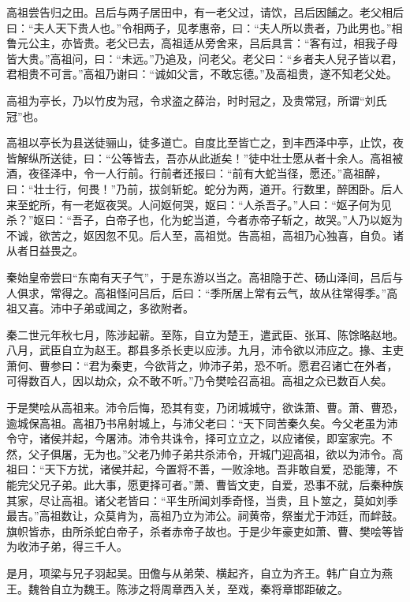 \documentclass[12pt,UTF8]{ctexbook}
\begin{document}
高祖尝告归之田。吕后与两子居田中，有一老父过，请饮，吕后因餔之。老父相后曰：“夫人天下贵人也。”令相两子，见孝惠帝，曰：“夫人所以贵者，乃此男也。”相鲁元公主，亦皆贵。老父已去，高祖适从旁舍来，吕后具言：“客有过，相我子母皆大贵。”高祖问，曰：“未远。”乃追及，问老父。老父曰：“乡者夫人兒子皆以君，君相贵不可言。”高祖乃谢曰：“诚如父言，不敢忘德。”及高祖贵，遂不知老父处。



高祖为亭长，乃以竹皮为冠，令求盗之薛治，时时冠之，及贵常冠，所谓“刘氏冠”也。



高祖以亭长为县送徒骊山，徒多道亡。自度比至皆亡之，到丰西泽中亭，止饮，夜皆解纵所送徒，曰：“公等皆去，吾亦从此逝矣！”徒中壮士愿从者十余人。高祖被酒，夜径泽中，令一人行前。行前者还报曰：“前有大蛇当径，愿还。”高祖醉，曰：“壮士行，何畏！”乃前，拔剑斩蛇。蛇分为两，道开。行数里，醉困卧。后人来至蛇所，有一老妪夜哭。人问妪何哭，妪曰：“人杀吾子。”人曰：“妪子何为见杀？”妪曰：“吾子，白帝子也，化为蛇当道，今者赤帝子斩之，故哭。”人乃以妪为不诚，欲苦之，妪因忽不见。后人至，高祖觉。告高祖，高祖乃心独喜，自负。诸从者日益畏之。



秦始皇帝尝曰“东南有天子气”，于是东游以当之。高祖隐于芒、砀山泽间，吕后与人俱求，常得之。高祖怪问吕后，后曰：“季所居上常有云气，故从往常得季。”高祖又喜。沛中子弟或闻之，多欲附者。



秦二世元年秋七月，陈涉起蕲。至陈，自立为楚王，遣武臣、张耳、陈馀略赵地。八月，武臣自立为赵王。郡县多杀长吏以应涉。九月，沛令欲以沛应之。掾、主吏萧何、曹参曰：“君为秦吏，今欲背之，帅沛子弟，恐不听。愿君召诸亡在外者，可得数百人，因以劫众，众不敢不听。”乃令樊哙召高祖。高祖之众已数百人矣。



于是樊哙从高祖来。沛令后悔，恐其有变，乃闭城城守，欲诛萧、曹。萧、曹恐，逾城保高祖。高祖乃书帛射城上，与沛父老曰：“天下同苦秦久矣。今父老虽为沛令守，诸侯并起，今屠沛。沛令共诛令，择可立立之，以应诸侯，即室家完。不然，父子俱屠，无为也。”父老乃帅子弟共杀沛令，开城门迎高祖，欲以为沛令。高祖曰：“天下方扰，诸侯并起，今置将不善，一败涂地。吾非敢自爱，恐能薄，不能完父兄子弟。此大事，愿更择可者。”萧、曹皆文吏，自爱，恐事不就，后秦种族其家，尽让高祖。诸父老皆曰：“平生所闻刘季奇怪，当贵，且卜筮之，莫如刘季最吉。”高祖数让，众莫肯为，高祖乃立为沛公。祠黄帝，祭蚩尤于沛廷，而衅鼓。旗帜皆赤，由所杀蛇白帝子，杀者赤帝子故也。于是少年豪吏如萧、曹、樊哙等皆为收沛子弟，得三千人。



是月，项梁与兄子羽起吴。田儋与从弟荣、横起齐，自立为齐王。韩广自立为燕王。魏咎自立为魏王。陈涉之将周章西入关，至戏，秦将章邯距破之。
\end{document}

